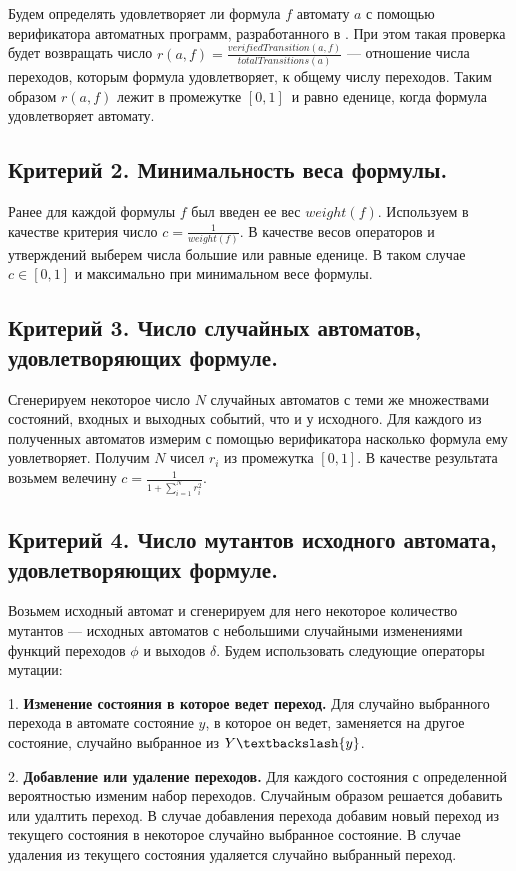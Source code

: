\documentclass[12pt,fleqn]{article}
\begin{document}
Будем определять удовлетворяет ли формула $f$ автомату $a$ с помощью верификатора автоматных программ, разработанного в \cite{eg}.
При этом такая проверка будет возвращать число $r(a, f) = \frac{verifiedTransition(a, f)}{totalTransitions(a)}$ --- отношение числа
переходов, которым формула удовлетворяет, к общему числу переходов. Таким образом $r(a, f)$ лежит в промежутке $[0, 1]$\ и равно
еденице, когда формула удовлетворяет автомату.

\subsection*{Критерий 2. Минимальность веса формулы.}

Ранее для каждой формулы $f$ был введен ее вес $weight(f)$. Используем в качестве критерия число $c = \frac{1}{weight(f)}$.
В качестве весов операторов и утверждений выберем числа большие или равные еденице.
В таком случае $c \in [0, 1]$ и максимально при минимальном весе формулы.

\subsection*{Критерий 3. Число случайных автоматов, удовлетворяющих формуле.}

Сгенерируем некоторое число $N$ случайных автоматов с теми же множествами состояний, входных и выходных событий, что и
у исходного. Для каждого из полученных автоматов измерим с помощью верификатора насколько формула ему уовлетворяет.
Получим $N$ чисел $r_i$ из промежутка $[0, 1]$. В качестве результата возьмем велечину $c = \frac{1}{1 + \sum_{i = 1}^{N}r_i^2}$.

\subsection*{Критерий 4. Число мутантов исходного автомата, удовлетворяющих формуле.}

Возьмем исходный автомат и сгенерируем для него некоторое количество мутантов --- исходных автоматов с небольшими
случайными изменениями функций переходов $\phi$ и выходов $\delta$. Будем использовать следующие операторы мутации:

1. \textbf{Изменение состояния в которое ведет переход.} Для случайно выбранного перехода в автомате состояние $y$,
в которое он ведет, заменяется на другое состояние, случайно выбранное из $Y\textbackslash \{y\}$. 

2. \textbf{Добавление или удаление переходов.} Для каждого состояния с определенной вероятностью изменим набор переходов.
Случайным образом решается добавить или удалтить переход. В случае добавления перехода добавим новый переход из
текущего состояния в некоторое случайно выбранное состояние. В случае удаления из текущего состояния удаляется
случайно выбранный переход.
\end{document}
